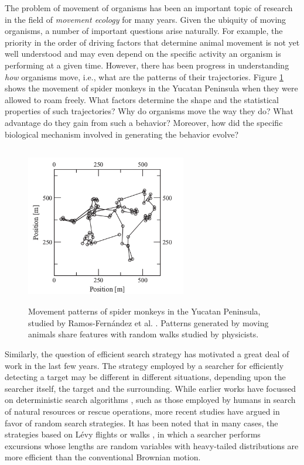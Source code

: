 \documentclass[12pt]{report}
\begin{document}
\begin{justify}
The problem of movement of organisms has been an important topic of research in the field of \textit{movement ecology} for many years. Given the ubiquity of moving organisms, a number of important questions arise naturally. For example, the priority in the order of driving factors that determine animal movement is not yet well understood and may even depend on the specific activity an organism is performing at a given time. However, there has been progress in understanding \textit{how} organisms move, i.e., what are the patterns of their trajectories. Figure \ref{fig:spdmk} shows the movement of spider monkeys in the Yucatan Peninsula when they were allowed to roam freely. What factors determine the shape and the statistical properties of such trajectories? Why do organisms move the way they do? What advantage do they gain from such a behavior? Moreover, how did the specific biological mechanism involved in generating the behavior evolve? \\
\begin{figure}[H]
\centering
\includegraphics[height=7cm, width = 7cm, keepaspectratio]{spider_monkey.png}
\caption{Movement patterns of spider monkeys in the Yucatan Peninsula, studied by Ramos-Fernández et al.\cite{spdmonkey} . Patterns generated by moving animals share features with random walks studied by physicists.}
\label{fig:spdmk}
\end{figure}

Similarly, the question of efficient search strategy has motivated a great deal of work in the last few years. The strategy employed by a searcher for efficiently detecting a target may be different in different situations, depending upon the searcher itself, the target and the surrounding. While earlier works have focussed on deterministic search algorithms \cite{deterministicAlgo}, such as those employed by humans in search of natural resources or rescue operations, more recent studies have argued in favor of random search strategies. It has been noted that in many cases, the strategies based on L\'evy flights or walks \cite{wanderingAlbatross, foraging}, in which a searcher performs excursions whose lengths are random variables with heavy-tailed distributions are more efficient than the conventional Brownian motion.\\


\end{justify}
\end{document}
